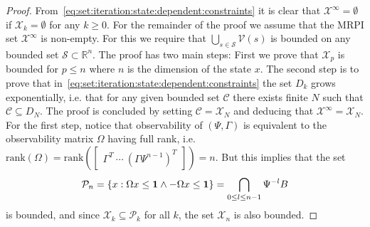 \documentclass[journal]{IEEEtran}
\theoremstyle{remark}
\theoremstyle{definition}
\begin{document}
\begin{proof}
From~\eqref{eq:set:iteration:state:dependent:constraints} it is clear that $\mathcal X^\infty = \emptyset$ 
if $\mathcal X_k =\emptyset$ for any $k\geq 0$.
%
For the remainder of the proof we assume that the MRPI set $\mathcal X^\infty$ is non-empty. 
%
For this we require that $\bigcup_{s\in\mathcal S}\mathcal V(s)$ is bounded on any bounded set 
$\mathcal S\subset\mathbb R^n$.
%
The proof has two main steps: 
%
First we prove that $\mathcal X_p$ is bounded for $p\leq n$ where $n$ is the dimension of the state $x$. 
%
The second step is to prove that in~\eqref{eq:set:iteration:state:dependent:constraints}
the set $D_k$ grows exponentially, i.e. that for any given bounded set $\mathcal C$ there exists
finite $N$ such that $\mathcal C\subseteq D_{N}$. The proof is concluded by setting 
$\mathcal C = \mathcal X_{N}$ and deducing that $\mathcal X^\infty = \mathcal X_N$. 
%
For the first step, notice that observability of $(\Psi,\Gamma)$ is equivalent to the observability matrix 
$\Omega$ having full rank, i.e.\ $\mathrm{rank}(\Omega) = \mathrm{rank}(\begin{bmatrix} \Gamma^T \ \cdots \ 
(\Gamma\Psi^{n-1})^T\end{bmatrix}) = n$.
But  this implies that the set 
%
\[
\mathcal P_{n} = \{x: 
\Omega x\leq{\bf{1}}\wedge-\Omega x\leq{\bf{1}}\} = \bigcap_{0\leq l\leq n-1} \Psi^{-l} B
\]
%
is bounded, and since $\mathcal X_k\subseteq \mathcal P_k$ for all $k$, 
the set $\mathcal X_{n}$ is also bounded.



\end{proof}
\end{document}
